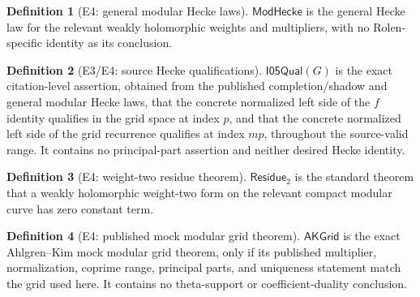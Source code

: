 \documentclass[11pt,a4paper]{article}
\numberwithin{equation}{section}
\theoremstyle{plain}\newtheorem{theorem}{Theorem}[section]\newaliascnt{proposition}{theorem}\newtheorem{proposition}[proposition]{Proposition}\aliascntresetthe{proposition}\newaliascnt{lemma}{theorem}\newtheorem{lemma}[lemma]{Lemma}\aliascntresetthe{lemma}
\theoremstyle{definition}\newaliascnt{definition}{theorem}\newtheorem{definition}[definition]{Definition}\aliascntresetthe{definition}\newaliascnt{notation}{theorem}\newtheorem{notation}[notation]{Notation}\aliascntresetthe{notation}
\providecommand{\lean}[1]{}\providecommand{\leanok}{}
\begin{document}
\begin{definition}[E4: general modular Hecke laws]\label{def_ext_modular_hecke}\lean{SptCM.RolenLiterature.GeneralModularHeckeLaws}\leanok
$\mathsf{ModHecke}$ is the general Hecke law for the relevant weakly holomorphic weights and multipliers, with no Rolen-specific identity as its conclusion.
\end{definition}
\begin{definition}[E3/E4: source Hecke qualifications]\label{def_ext_i05_source_qualification}\lean{SptCM.Analytic.Repaired.SourceI05Qualification}\leanok
$\mathsf{I05Qual}(G)$ is the exact citation-level assertion, obtained from the
published completion/shadow and general modular Hecke laws, that the concrete
normalized left side of the $f$ identity qualifies in the grid space at index
$p$, and that the concrete normalized left side of the grid recurrence
qualifies at index $mp$, throughout the source-valid range.  It contains no
principal-part assertion and neither desired Hecke identity.
\end{definition}
\begin{definition}[E4: weight-two residue theorem]\label{def_ext_weight_two_residue}\lean{SptCM.RolenLiterature.WeightTwoResidueTheorem}\leanok
$\mathsf{Residue}_2$ is the standard theorem that a weakly holomorphic weight-two form on the relevant compact modular curve has zero constant term.
\end{definition}
\begin{definition}[E4: published mock modular grid theorem]\label{def_ext_published_grid}\lean{SptCM.RolenLiterature.PublishedMockModularGrid}\leanok
$\mathsf{AKGrid}$ is the exact Ahlgren--Kim mock modular grid theorem, only if its published multiplier, normalization, coprime range, principal parts, and uniqueness statement match the grid used here.  It contains no theta-support or coefficient-duality conclusion.
\end{definition}
\end{document}
